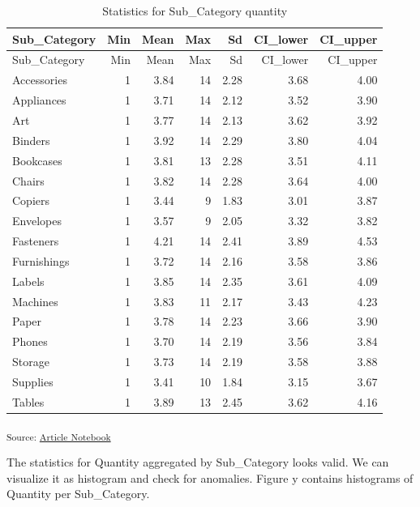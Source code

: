 \documentclass[
  letterpaper,
  DIV=11,
  numbers=noendperiod,
  oneside]{scrartcl}
\begin{document}
\begin{longtable}[]{@{}lrrrrrr@{}}
\caption{Statistics for Sub\_Category quantity}\tabularnewline
\toprule\noalign{}
Sub\_Category & Min & Mean & Max & Sd & CI\_lower & CI\_upper \\
\midrule\noalign{}
\endfirsthead
\toprule\noalign{}
Sub\_Category & Min & Mean & Max & Sd & CI\_lower & CI\_upper \\
\midrule\noalign{}
\endhead
\bottomrule\noalign{}
\endlastfoot
Accessories & 1 & 3.84 & 14 & 2.28 & 3.68 & 4.00 \\
Appliances & 1 & 3.71 & 14 & 2.12 & 3.52 & 3.90 \\
Art & 1 & 3.77 & 14 & 2.13 & 3.62 & 3.92 \\
Binders & 1 & 3.92 & 14 & 2.29 & 3.80 & 4.04 \\
Bookcases & 1 & 3.81 & 13 & 2.28 & 3.51 & 4.11 \\
Chairs & 1 & 3.82 & 14 & 2.28 & 3.64 & 4.00 \\
Copiers & 1 & 3.44 & 9 & 1.83 & 3.01 & 3.87 \\
Envelopes & 1 & 3.57 & 9 & 2.05 & 3.32 & 3.82 \\
Fasteners & 1 & 4.21 & 14 & 2.41 & 3.89 & 4.53 \\
Furnishings & 1 & 3.72 & 14 & 2.16 & 3.58 & 3.86 \\
Labels & 1 & 3.85 & 14 & 2.35 & 3.61 & 4.09 \\
Machines & 1 & 3.83 & 11 & 2.17 & 3.43 & 4.23 \\
Paper & 1 & 3.78 & 14 & 2.23 & 3.66 & 3.90 \\
Phones & 1 & 3.70 & 14 & 2.19 & 3.56 & 3.84 \\
Storage & 1 & 3.73 & 14 & 2.19 & 3.58 & 3.88 \\
Supplies & 1 & 3.41 & 10 & 1.84 & 3.15 & 3.67 \\
Tables & 1 & 3.89 & 13 & 2.45 & 3.62 & 4.16 \\
\end{longtable}

\textsubscript{Source:
\href{https://SJbrou.github.io/Supply_Chain_Data_Analysis/index.qmd.html}{Article
Notebook}}

The statistics for Quantity aggregated by Sub\_Category looks valid. We
can visualize it as histogram and check for anomalies. Figure y contains
histograms of Quantity per Sub\_Category.
\end{document}
